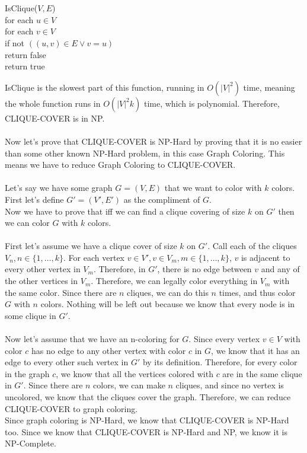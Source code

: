 \documentclass[11pt]{article}
\begin{document}
\begin{solution}
\begin{itemize}
\begin{algo}
                \\ \\ IsClique($V, E$)  \+
                \\ for each $u \in V$ \+
                \\ for each $v \in V$ \+
                \\ if not $((u, v) \in E \lor v = u)$ \+
                \\ return false \-\-\-
                \\ return true
            \end{algo}
            IsClique is the slowest part of this function, running in $O(|V|^2)$ time, meaning the whole function runs in $O(|V|^2k)$ time, which is polynomial. Therefore, CLIQUE-COVER is in NP.
            \\\\ Now let's prove that CLIQUE-COVER is NP-Hard by proving that it is no easier than some other known NP-Hard problem, in this case Graph Coloring. This means we have to reduce Graph Coloring to CLIQUE-COVER.
            \\ \\ Let's say we have some graph $G = (V, E)$ that we want to color with $k$ colors. First let's define $G' = (V', E')$ as the compliment of $G$.
            \\ Now we have to prove that iff we can find a clique covering of size $k$ on $G'$ then we can color $G$ with $k$ colors.
            \\ 
            \\ First let's assume we have a clique cover of size $k$ on $G'$. Call each of the cliques $V_n, n \in \{1,\ldots, k\}$.
            For each vertex $v \in V', v \in V_m, m \in \{1, \ldots, k\}$, $v$ is adjacent to every other vertex in $V_m$.
            Therefore, in $G'$, there is no edge between $v$ and any of the other vertices in $V_m$. Therefore, we can legally color everything in $V_m$ with the same color.
            Since there are $n$ cliques, we can do this $n$ times, and thus color $G$ with $n$ colors. Nothing will be left out because we know that every node is in some clique in $G'$.
            \\ 
            \\ Now let's assume that we have an n-coloring for $G$. Since every vertex $v \in V$ with color $c$ has no edge to any other vertex with color $c$ in $G$, we know that it has an edge to every other such vertex in $G'$ by its definition. Therefore, for every color in the graph $c$, we know that all the vertices colored with $c$ are in the same clique in $G'$. Since there are $n$ colors, we can make $n$ cliques, and since no vertex is uncolored, we know that the cliques cover the graph. Therefore, we can reduce CLIQUE-COVER to graph coloring.
            \\ Since graph coloring is NP-Hard, we know that CLIQUE-COVER is NP-Hard too. Since we know that CLIQUE-COVER is NP-Hard and NP, we know it is NP-Complete. 
    \end{itemize}
\end{solution}
\end{document}
